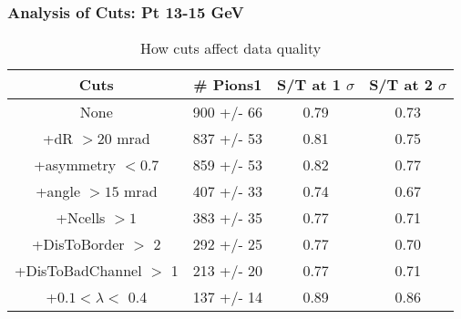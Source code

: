 \frame
{
\frametitle{Analysis of Cuts: Pt 13-15 GeV}
\begin{table}
\caption{How cuts affect data quality}
\centering
\begin{tabular}{c c c c}
\hline\hline
Cuts & \# Pions1 & S/T at 1 $\sigma$ & S/T at 2 $\sigma$ \\ [0.5ex]
\hline
None &  900 +/-   66 & 0.79 & 0.73 \\ %
+dR $> 20$ mrad &  837 +/-   53 & 0.81 & 0.75 \\ %
+asymmetry $< 0.7$ &  859 +/-   53 & 0.82 & 0.77 \\ %
+angle $> 15$ mrad &  407 +/-   33 & 0.74 & 0.67 \\ %
+Ncells $> 1$&  383 +/-   35 & 0.77 & 0.71 \\ %
+DisToBorder $>$ 2 &  292 +/-   25 & 0.77 & 0.70 \\ %
+DisToBadChannel $>$ 1&  213 +/-   20 & 0.77 & 0.71 \\ %
+$0.1 < \lambda <$ 0.4 &  137 +/-   14 & 0.89 & 0.86 \\ %
[1ex]
\hline
\end{tabular}
\label{table:nonlin}
\end{table}
}
